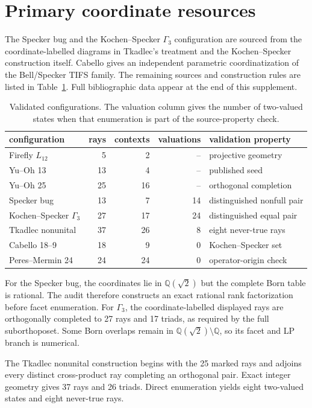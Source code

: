 \documentclass[11pt]{article}
\begin{document}
\section{Primary coordinate resources}

The Specker bug and the Kochen--Specker $\Gamma_3$ configuration are sourced
from the coordinate-labelled diagrams in Tkadlec's treatment and the
Kochen--Specker construction itself.  Cabello gives an independent parametric
coordinatization of the Bell/Specker TIFS family.  The remaining sources and
construction rules are listed in Table~\ref{tab:sources}.  Full bibliographic
data appear at the end of this supplement.

\begin{table}[ht]
\centering
\caption{Validated configurations.  The valuation column gives the number of
two-valued states when that enumeration is part of the source-property check.}
\label{tab:sources}
\small
\begin{tabular}{lrrrl}
\toprule
configuration & rays & contexts & valuations & validation property\\
\midrule
Firefly $L_{12}$ & 5 & 2 & -- & projective geometry\\
Yu--Oh 13 & 13 & 4 & -- & published seed\\
Yu--Oh 25 & 25 & 16 & -- & orthogonal completion\\
Specker bug & 13 & 7 & 14 & distinguished nonfull pair\\
Kochen--Specker $\Gamma_3$ & 27 & 17 & 24 & distinguished equal pair\\
Tkadlec nonunital & 37 & 26 & 8 & eight never-true rays\\
Cabello 18--9 & 18 & 9 & 0 & Kochen--Specker set\\
Peres--Mermin 24 & 24 & 24 & 0 & operator-origin check\\
\bottomrule
\end{tabular}
\end{table}

For the Specker bug, the coordinates lie in $\mathbb Q(\sqrt2)$ but the
complete Born table is rational.  The audit therefore constructs an exact
rational rank factorization before facet enumeration.  For $\Gamma_3$, the
coordinate-labelled displayed rays are orthogonally completed to 27 rays and
17 triads, as required by the full suborthoposet.  Some Born overlaps remain in
$\mathbb Q(\sqrt2)\setminus\mathbb Q$, so its facet and LP branch is numerical.

The Tkadlec nonunital construction begins with the 25 marked rays and adjoins
every distinct cross-product ray completing an orthogonal pair.  Exact integer
geometry gives 37 rays and 26 triads.  Direct enumeration yields eight
two-valued states and eight never-true rays.
\end{document}

